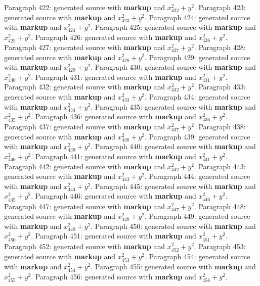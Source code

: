 \documentclass{article}
\begin{document}
Paragraph 422: generated source with \textbf{markup} and $x_{422}^2 + y^2$.
Paragraph 423: generated source with \textbf{markup} and $x_{423}^2 + y^2$.
Paragraph 424: generated source with \textbf{markup} and $x_{424}^2 + y^2$.
Paragraph 425: generated source with \textbf{markup} and $x_{425}^2 + y^2$.
Paragraph 426: generated source with \textbf{markup} and $x_{426}^2 + y^2$.
Paragraph 427: generated source with \textbf{markup} and $x_{427}^2 + y^2$.
Paragraph 428: generated source with \textbf{markup} and $x_{428}^2 + y^2$.
Paragraph 429: generated source with \textbf{markup} and $x_{429}^2 + y^2$.
Paragraph 430: generated source with \textbf{markup} and $x_{430}^2 + y^2$.
Paragraph 431: generated source with \textbf{markup} and $x_{431}^2 + y^2$.
Paragraph 432: generated source with \textbf{markup} and $x_{432}^2 + y^2$.
Paragraph 433: generated source with \textbf{markup} and $x_{433}^2 + y^2$.
Paragraph 434: generated source with \textbf{markup} and $x_{434}^2 + y^2$.
Paragraph 435: generated source with \textbf{markup} and $x_{435}^2 + y^2$.
Paragraph 436: generated source with \textbf{markup} and $x_{436}^2 + y^2$.
Paragraph 437: generated source with \textbf{markup} and $x_{437}^2 + y^2$.
Paragraph 438: generated source with \textbf{markup} and $x_{438}^2 + y^2$.
Paragraph 439: generated source with \textbf{markup} and $x_{439}^2 + y^2$.
Paragraph 440: generated source with \textbf{markup} and $x_{440}^2 + y^2$.
Paragraph 441: generated source with \textbf{markup} and $x_{441}^2 + y^2$.
Paragraph 442: generated source with \textbf{markup} and $x_{442}^2 + y^2$.
Paragraph 443: generated source with \textbf{markup} and $x_{443}^2 + y^2$.
Paragraph 444: generated source with \textbf{markup} and $x_{444}^2 + y^2$.
Paragraph 445: generated source with \textbf{markup} and $x_{445}^2 + y^2$.
Paragraph 446: generated source with \textbf{markup} and $x_{446}^2 + y^2$.
Paragraph 447: generated source with \textbf{markup} and $x_{447}^2 + y^2$.
Paragraph 448: generated source with \textbf{markup} and $x_{448}^2 + y^2$.
Paragraph 449: generated source with \textbf{markup} and $x_{449}^2 + y^2$.
Paragraph 450: generated source with \textbf{markup} and $x_{450}^2 + y^2$.
Paragraph 451: generated source with \textbf{markup} and $x_{451}^2 + y^2$.
Paragraph 452: generated source with \textbf{markup} and $x_{452}^2 + y^2$.
Paragraph 453: generated source with \textbf{markup} and $x_{453}^2 + y^2$.
Paragraph 454: generated source with \textbf{markup} and $x_{454}^2 + y^2$.
Paragraph 455: generated source with \textbf{markup} and $x_{455}^2 + y^2$.
Paragraph 456: generated source with \textbf{markup} and $x_{456}^2 + y^2$.
\end{document}
